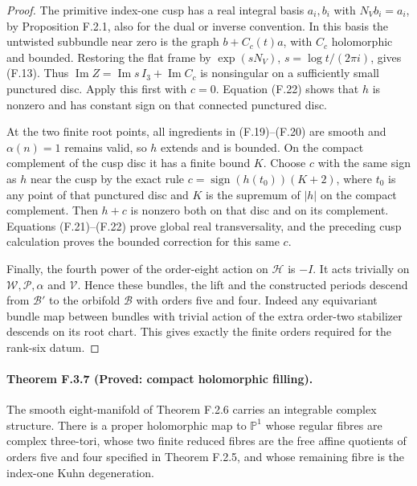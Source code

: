 \begin{proof}
The primitive index-one cusp has a real integral basis
$a_i,b_i$ with $N_Vb_i=a_i$, by Proposition F.2.1, also for the
dual or inverse convention.  In this basis the untwisted
subbundle near zero is the graph $b+C_c(t)a$, with $C_c$
holomorphic and bounded.  Restoring the flat frame by
$\exp(sN_V)$, $s=\log t/(2\pi i)$, gives (F.13).
Thus $\operatorname{Im}Z=\operatorname{Im}s\,I_3+
\operatorname{Im}C_c$ is nonsingular on a sufficiently small
punctured disc.  Apply this first with $c=0$.
Equation (F.22) shows that $h$ is nonzero and has constant sign
on that connected punctured disc.

At the two finite root points, all ingredients in (F.19)--(F.20)
are smooth and $\alpha(n)=1$ remains valid, so $h$ extends and
is bounded.  On the compact complement of the cusp disc it has
a finite bound $K$.  Choose $c$ with the same sign as $h$ near
the cusp by the exact rule
$c=\operatorname{sign}(h(t_0))(K+2)$, where $t_0$ is any point
of that punctured disc and $K$ is the supremum of $|h|$ on
the compact complement.  Then $h+c$ is nonzero both on that
disc and on its complement.  Equations (F.21)--(F.22) prove
global real transversality, and the preceding cusp calculation
proves the bounded correction for this same $c$.

Finally, the fourth power of the order-eight action on
$\mathcal H$ is $-I$.  It acts trivially on
$\mathcal W,\mathcal P,\alpha$ and $\mathcal V$.
Hence these bundles, the lift and the constructed periods descend
from $\mathcal B'$ to the orbifold $\mathcal B$ with orders five
and four.  Indeed any equivariant bundle map between bundles with
trivial action of the extra order-two stabilizer descends on its
root chart.  This gives exactly the finite orders required for
the rank-six datum.
\end{proof}

\paragraph{Theorem F.3.7 (Proved: compact holomorphic filling).}
The smooth eight-manifold of Theorem F.2.6 carries an integrable
complex structure.  There is a proper holomorphic map to
$\mathbb P^1$ whose regular fibres are complex three-tori,
whose two finite reduced fibres are the free affine quotients
of orders five and four specified in Theorem F.2.5, and whose
remaining fibre is the index-one Kuhn degeneration.

